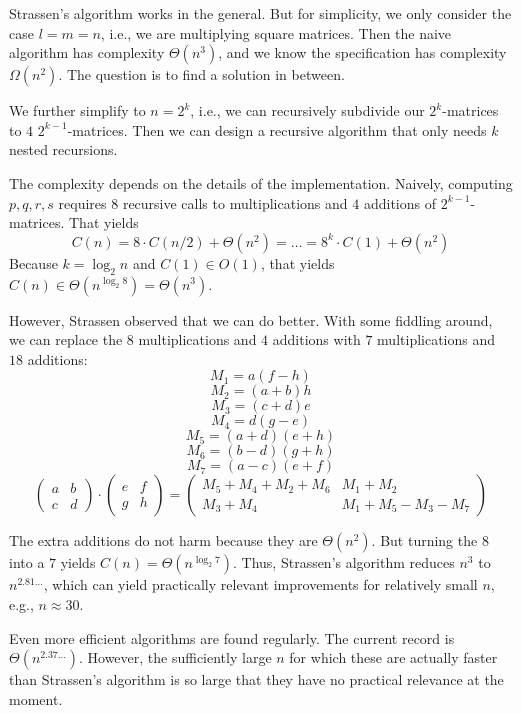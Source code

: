 Strassen's algorithm works in the general.
But for simplicity, we only consider the case $l=m=n$, i.e., we are multiplying square matrices.
Then the naive algorithm has complexity $\Theta(n^3)$, and we know the specification has complexity $\Omega(n^2)$.
The question is to find a solution in between.

We further simplify to $n=2^k$, i.e., we can recursively subdivide our $2^k$-matrices to $4$ $2^{k-1}$-matrices.
Then we can design a recursive algorithm that only needs $k$ nested recursions.

The complexity depends on the details of the implementation.
Naively, computing $p,q,r,s$ requires $8$ recursive calls to multiplications and $4$ additions of $2^{k-1}$-matrices.
That yields
 \[C(n)=8\cdot C(n/2) + \Theta(n^2) = \ldots = 8^k\cdot C(1)+\Theta(n^2)\]
Because $k=\log_2 n$ and $C(1)\in O(1)$, that yields $C(n)\in\Theta(n^{\log_2 8})=\Theta(n^3)$.

However, Strassen observed that we can do better.
With some fiddling around, we can replace the $8$ multiplications and $4$ additions with $7$ multiplications and $18$ additions:
\[M_1 = a(f-h)\]
\[M_2 = (a+b)h\]
\[M_3 = (c+d)e\]
\[M_4 = d(g-e)\]
\[M_5 = (a+d)(e+h)\]
\[M_6 = (b-d)(g+h)\]
\[M_7 = (a-c)(e+f)\]
\[\begin{pmatrix} a & b \\ c & d\end{pmatrix}\cdot \begin{pmatrix} e & f \\ g & h\end{pmatrix}=
  \begin{pmatrix} M_5 + M_4 + M_2 + M_6 & M_1 + M_2 \\ M_3 + M_4 & M_1 + M_5 - M_3 - M_7 \end{pmatrix}\]

The extra additions do not harm because they are $\Theta(n^2)$.
But turning the $8$ into a $7$ yields $C(n)=\Theta(n^{\log_2 7})$.
Thus, Strassen's algorithm reduces $n^3$ to $n^{2.81\ldots}$, which can yield practically relevant improvements for relatively small $n$, e.g., $n\approx 30$.
\medskip

Even more efficient algorithms are found regularly.
The current record is $\Theta(n^{2.37\ldots})$.
However, the sufficiently large $n$ for which these are actually faster than Strassen's algorithm is so large that they have no practical relevance at the moment.

